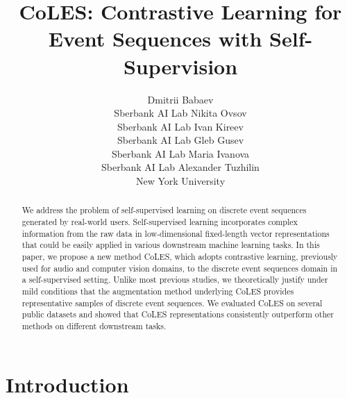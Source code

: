 \documentclass{article}
\title{CoLES: Contrastive Learning for Event Sequences with Self-Supervision}
\author{
Dmitrii Babaev \\
Sberbank AI Lab
\And
Nikita Ovsov \\
Sberbank AI Lab
\And
Ivan Kireev \\
Sberbank AI Lab
\And
Gleb Gusev \\
Sberbank AI Lab
\And
Maria Ivanova \\
Sberbank AI Lab
\And
Alexander Tuzhilin \\
New York University
}
\begin{document}
\maketitle

\begin{abstract}

We address the problem of self-supervised learning on discrete event sequences generated by real-world users. Self-supervised learning incorporates complex information from the raw data in low-dimensional fixed-length vector representations that could be easily applied in various downstream machine learning tasks. In this paper, we propose a new method CoLES, which adopts contrastive learning, previously used for audio and computer vision domains, to the discrete event sequences domain in a self-supervised setting. Unlike most previous studies, we theoretically justify under mild conditions that the augmentation method underlying CoLES provides representative samples of discrete event sequences. We evaluated CoLES on several public datasets and showed that CoLES representations  
consistently outperform other methods on different downstream tasks.

\end{abstract}

\section{Introduction} \label{sec-intro}

\end{document}
